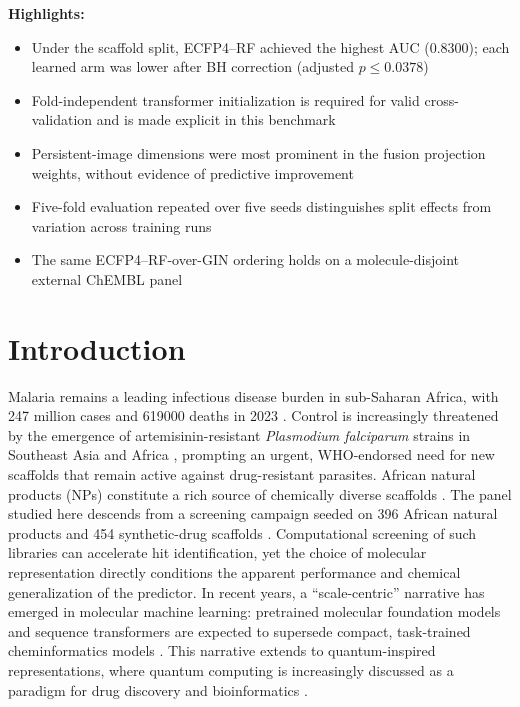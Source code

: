 \documentclass[11pt,a4paper]{article}
\begin{document}
\noindent\textbf{Highlights:}
\begin{itemize}
\item Under the scaffold split, ECFP4--RF achieved the highest AUC (\num{0.8300}); each learned arm was lower after BH correction (adjusted $p \le \num{0.0378}$)
\item Fold-independent transformer initialization is required for valid cross-validation and is made explicit in this benchmark
\item Persistent-image dimensions were most prominent in the fusion projection weights, without evidence of predictive improvement
\item Five-fold evaluation repeated over five seeds distinguishes split effects from variation across training runs
\item The same ECFP4--RF-over-GIN ordering holds on a molecule-disjoint external ChEMBL panel
\end{itemize}

\section{Introduction}

Malaria remains a leading infectious disease burden in sub-Saharan Africa, with \num{247} million cases and \num{619000} deaths in \num{2023} \citep{who2024malariareport}. Control is increasingly threatened by the emergence of artemisinin-resistant \emph{Plasmodium falciparum} strains in Southeast Asia and Africa \citep{ariyey2014,ashley2018}, prompting an urgent, WHO-endorsed need for new scaffolds that remain active against drug-resistant parasites. African natural products (NPs) constitute a rich source of chemically diverse scaffolds \citep{anpdb_2026,value_addition_african_np_2025}. The panel studied here descends from a screening campaign seeded on \num{396} African natural products and \num{454} synthetic-drug scaffolds \citep{temgoua2026antimalarial}. Computational screening of such libraries can accelerate hit identification, yet the choice of molecular representation directly conditions the apparent performance and chemical generalization of the predictor. In recent years, a ``scale-centric'' narrative has emerged in molecular machine learning: pretrained molecular foundation models and sequence transformers are expected to supersede compact, task-trained cheminformatics models \citep{mol_tdl_2026,tn_efficient_2026}. This narrative extends to quantum-inspired representations, where quantum computing is increasingly discussed as a paradigm for drug discovery and bioinformatics \citep{naleczcharkiewicz2024,kumar2024quantumdrug}.
\end{document}
